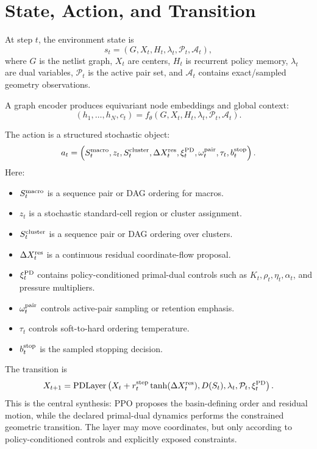 \documentclass[11pt]{article}
\newcommand{\Pset}{\mathcal{P}}
\newcommand{\Audit}{\mathcal{A}}
\newcommand{\PD}{\operatorname{PDLayer}}
\begin{document}
\section{State, Action, and Transition}

At step $t$, the environment state is
\[
    s_t=(G,X_t,H_t,\lambda_t,\Pset_t,\Audit_t),
\]
where $G$ is the netlist graph, $X_t$ are centers, $H_t$ is recurrent policy memory, $\lambda_t$ are dual variables, $\Pset_t$ is the active pair set, and $\Audit_t$ contains exact/sampled geometry observations.

A graph encoder produces equivariant node embeddings and global context:
\[
    (h_1,\ldots,h_N,c_t)=f_\theta(G,X_t,H_t,\lambda_t,\Pset_t,\Audit_t).
\]

The action is a structured stochastic object:
\[
    a_t=\left(
    S_t^{\rm macro},
    z_t,
    S_t^{\rm cluster},
    \Delta X_t^{\rm res},
    \xi_t^{\rm PD},
    \omega_t^{\rm pair},
    \tau_t,
    b_t^{\rm stop}
    \right).
\]
Here:
\begin{itemize}
    \item $S_t^{\rm macro}$ is a sequence pair or DAG ordering for macros.
    \item $z_t$ is a stochastic standard-cell region or cluster assignment.
    \item $S_t^{\rm cluster}$ is a sequence pair or DAG ordering over clusters.
    \item $\Delta X_t^{\rm res}$ is a continuous residual coordinate-flow proposal.
    \item $\xi_t^{\rm PD}$ contains policy-conditioned primal-dual controls such as $K_t,\rho_t,\eta_t,\alpha_t$, and pressure multipliers.
    \item $\omega_t^{\rm pair}$ controls active-pair sampling or retention emphasis.
    \item $\tau_t$ controls soft-to-hard ordering temperature.
    \item $b_t^{\rm stop}$ is the sampled stopping decision.
\end{itemize}

The transition is
\[
    X_{t+1}=\PD\left(
        X_t+r_t^{\rm step}\tanh(\Delta X_t^{\rm res}),
        D(S_t),
        \lambda_t,
        \Pset_t,
        \xi_t^{\rm PD}
    \right).
\]
This is the central synthesis: PPO proposes the basin-defining order and residual motion, while the declared primal-dual dynamics performs the constrained geometric transition. The layer may move coordinates, but only according to policy-conditioned controls and explicitly exposed constraints.
\end{document}
